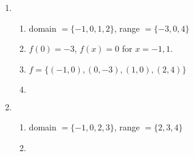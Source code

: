 \documentclass{ximera}
\begin{document}
\begin{enumerate}

\item   

\begin{enumerate}

\item domain $ = \{ -1, 0, 1, 2 \}$, range $ = \{ -3, 0, 4\}$

\item  $f(0) = -3$,  $f(x) = 0$ for $x = -1, 1$.

\item  $f = \{ (-1,0), (0, -3), (1,0), (2,4) \}$

  

\item  $~$


\end{enumerate}


\item    

\begin{enumerate}

\item  domain $= \{ -1, 0, 2, 3 \}$, range $=\{ 2, 3, 4 \}$

\item $~$



\end{enumerate}
\end{enumerate}
\end{document}
